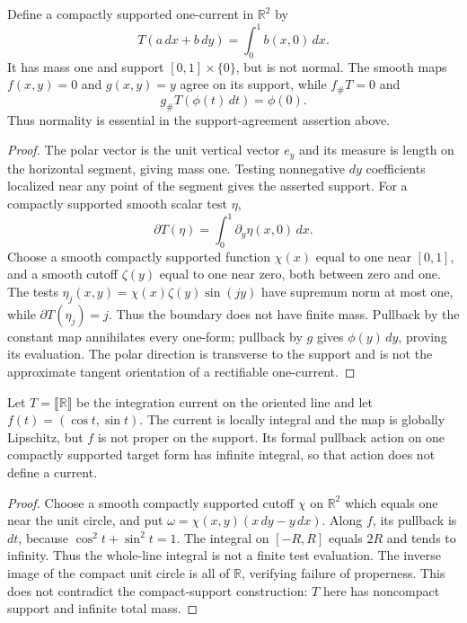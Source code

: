 \begin{example}\label{ex:transverse-current-support-values}
Define a compactly supported one-current in $\mathbb R^2$ by
\[
 T(a\,dx+b\,dy)=\int_0^1 b(x,0)\,dx.
\]
It has mass one and support $[0,1]\times\{0\}$, but is not normal. The smooth maps $f(x,y)=0$ and $g(x,y)=y$ agree on its support, while $f_\#T=0$ and
\[
 g_\#T(\phi(t)\,dt)=\phi(0).
\]
Thus normality is essential in the support-agreement assertion above.
\end{example}
\begin{proof}
The polar vector is the unit vertical vector $e_y$ and its measure is length on the horizontal segment, giving mass one. Testing nonnegative $dy$ coefficients localized near any point of the segment gives the asserted support. For a compactly supported smooth scalar test $\eta$,
\[
 \partial T(\eta)=\int_0^1\partial_y\eta(x,0)\,dx.
\]
Choose a smooth compactly supported function $\chi(x)$ equal to one near $[0,1]$, and a smooth cutoff $\zeta(y)$ equal to one near zero, both between zero and one. The tests $\eta_j(x,y)=\chi(x)\zeta(y)\sin(jy)$ have supremum norm at most one, while $\partial T(\eta_j)=j$. Thus the boundary does not have finite mass. Pullback by the constant map annihilates every one-form; pullback by $g$ gives $\phi(y)\,dy$, proving its evaluation. The polar direction is transverse to the support and is not the approximate tangent orientation of a rectifiable one-current.
\end{proof}

\begin{example}\label{ex:nonproper-periodic-current-map}
Let $T=\llbracket\mathbb R\rrbracket$ be the integration current on the oriented line and let $f(t)=(\cos t,\sin t)$. The current is locally integral and the map is globally Lipschitz, but $f$ is not proper on the support. Its formal pullback action on one compactly supported target form has infinite integral, so that action does not define a current.
\end{example}
\begin{proof}
Choose a smooth compactly supported cutoff $\chi$ on $\mathbb R^2$ which equals one near the unit circle, and put $\omega=\chi(x,y)(x\,dy-y\,dx)$. Along $f$, its pullback is $dt$, because $\cos^2t+\sin^2t=1$. The integral on $[-R,R]$ equals $2R$ and tends to infinity. Thus the whole-line integral is not a finite test evaluation. The inverse image of the compact unit circle is all of $\mathbb R$, verifying failure of properness. This does not contradict the compact-support construction: $T$ here has noncompact support and infinite total mass.
\end{proof}
